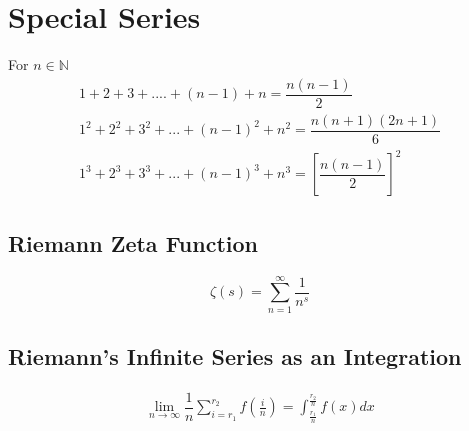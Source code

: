 \documentclass[../main.tex]{subfiles}
\begin{document}
	
	\section{Special Series}
	For $n\in\mathbb{N}$
	\begin{align}
		1+2+3+....+(n-1)+n=\dfrac{n(n-1)}{2}\\
		1^2+2^2+3^2+...+(n-1)^2+n^2=\dfrac{n(n+1)(2n+1)}{6}\\
		1^3+2^3+3^3+...+(n-1)^3+n^3=[\dfrac{n(n-1)}{2}]^2
	\end{align}
	\subsection{Riemann Zeta Function}
	\begin{equation}
		\zeta(s)=\sum_{n=1}^\infty \dfrac{1}{n^s}
	\end{equation}
	\subsection{Riemann's Infinite Series as an Integration}
	\label{riemannsum}
	\begin{align}
		\lim_{n\to\infty} \dfrac{1}{n}\sum_{i=r_1}^{r_2} f(\frac{i}{n})=\int_{\frac{r_1}{n}}^{\frac{r_2}{n}} f(x) dx
	\end{align}
\end{document}
